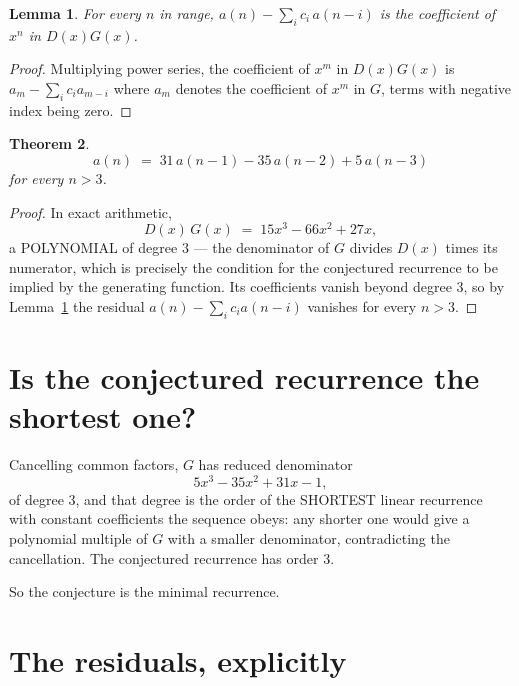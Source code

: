 \documentclass[11pt,a4paper]{article}
\theoremstyle{plain}
\newtheorem{theorem}{Theorem}
\newtheorem{lemma}[theorem]{Lemma}
\theoremstyle{definition}
\begin{document}
\begin{lemma}\label{lem:key}
For every $n$ in range, $a(n)-\sum_i c_i\,a(n-i)$ is the coefficient of $x^{n}$ in
$D(x)G(x)$.
\end{lemma}

\begin{proof}
Multiplying power series, the coefficient of $x^{m}$ in $D(x)G(x)$ is
$a_m-\sum_i c_i a_{m-i}$ where $a_m$ denotes the coefficient of $x^{m}$ in $G$, terms with
negative index being zero.
\end{proof}

\begin{theorem}
\[
a(n)\;=\;31\,a(n-1) - 35\,a(n-2) + 5\,a(n-3)
\]
for every $n>3$.
\end{theorem}

\begin{proof}
In exact arithmetic,
\[
D(x)\,G(x)\;=\;15 x^{3} - 66 x^{2} + 27 x,
\]
a POLYNOMIAL of degree $3$ --- the denominator of $G$ divides $D(x)$ times its numerator,
which is precisely the condition for the conjectured recurrence to be implied by the
generating function. Its coefficients vanish beyond degree $3$, so by
Lemma~\ref{lem:key} the residual $a(n)-\sum_ic_ia(n-i)$ vanishes for every
$n>3$.
\end{proof}

\section{Is the conjectured recurrence the shortest one?}

Cancelling common factors, $G$ has reduced denominator
\[
5 x^{3} - 35 x^{2} + 31 x - 1,
\]
of degree $3$, and that degree is the order of the SHORTEST linear recurrence with
constant coefficients the sequence obeys: any shorter one would give a polynomial multiple of
$G$ with a smaller denominator, contradicting the cancellation. The conjectured recurrence has
order $3$.

So the conjecture is the minimal recurrence.

\section{The residuals, explicitly}
\end{document}
